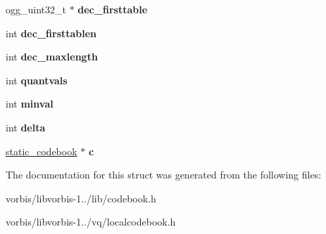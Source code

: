 \begin{DoxyCompactItemize}
\item 
\hypertarget{structcodebook_a037eee9db5ac27e82c3be1a3e24ffebd}{ogg\+\_\+uint32\+\_\+t $\ast$ {\bfseries dec\+\_\+firsttable}}\label{structcodebook_a037eee9db5ac27e82c3be1a3e24ffebd}

\item 
\hypertarget{structcodebook_ab3661a7669c853181bf70ca9296649c1}{int {\bfseries dec\+\_\+firsttablen}}\label{structcodebook_ab3661a7669c853181bf70ca9296649c1}

\item 
\hypertarget{structcodebook_a53d70c4645254078f75ddd0420ce8e52}{int {\bfseries dec\+\_\+maxlength}}\label{structcodebook_a53d70c4645254078f75ddd0420ce8e52}

\item 
\hypertarget{structcodebook_a02612403c90ae6b2044d926db9764c8a}{int {\bfseries quantvals}}\label{structcodebook_a02612403c90ae6b2044d926db9764c8a}

\item 
\hypertarget{structcodebook_af5e852ab410920fe29bcaae8552cd491}{int {\bfseries minval}}\label{structcodebook_af5e852ab410920fe29bcaae8552cd491}

\item 
\hypertarget{structcodebook_aad494f73f5a9601fa1487bc6273a9c51}{int {\bfseries delta}}\label{structcodebook_aad494f73f5a9601fa1487bc6273a9c51}

\item 
\hypertarget{structcodebook_a5fa8f287f190d6cffc282dbe3449c60c}{\hyperlink{structstatic__codebook}{static\+\_\+codebook} $\ast$ {\bfseries c}}\label{structcodebook_a5fa8f287f190d6cffc282dbe3449c60c}

\end{DoxyCompactItemize}


The documentation for this struct was generated from the following files\+:\begin{DoxyCompactItemize}
\item 
vorbis/libvorbis-\/1../lib/codebook.\+h\item 
vorbis/libvorbis-\/1../vq/localcodebook.\+h\end{DoxyCompactItemize}
